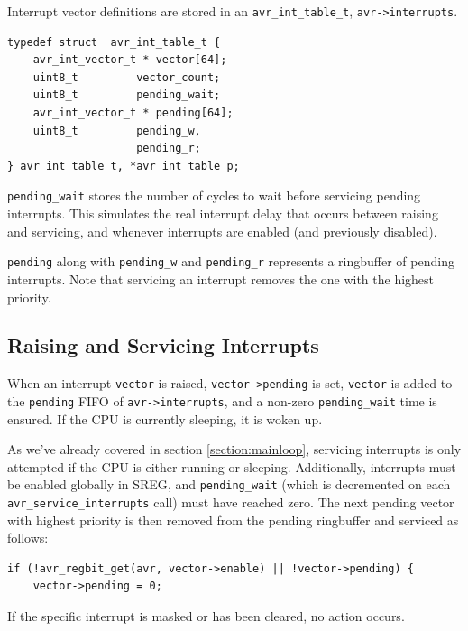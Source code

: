 Interrupt vector definitions are stored in an \lstinline|avr_int_table_t|,
\lstinline|avr->interrupts|.

\begin{lstlisting}
typedef struct  avr_int_table_t {
    avr_int_vector_t * vector[64];
    uint8_t         vector_count;
    uint8_t         pending_wait;
    avr_int_vector_t * pending[64];
    uint8_t         pending_w,
                    pending_r;
} avr_int_table_t, *avr_int_table_p;
\end{lstlisting}

\lstinline|pending_wait| stores the number of cycles to wait before servicing
pending interrupts. This simulates the real interrupt delay that occurs between
raising and servicing, and whenever interrupts are enabled
(and previously disabled).

\lstinline|pending| along with \lstinline|pending_w| and \lstinline|pending_r|
represents a ringbuffer of pending interrupts. Note that servicing an
interrupt removes the one with the highest priority.


\subsection{Raising and Servicing Interrupts}

When an interrupt \lstinline|vector| is raised, \lstinline|vector->pending| is
set, \lstinline|vector| is added to the \lstinline|pending| \ac{FIFO} of
\lstinline|avr->interrupts|, and a non-zero \lstinline|pending_wait| time is
ensured. If the \ac{CPU} is currently sleeping, it is woken up.

As we've already covered in section \ref{section:mainloop}, servicing interrupts is
only attempted if the \ac{CPU} is either running or sleeping. Additionally,
interrupts must be enabled globally in \ac{SREG}, and \lstinline|pending_wait|
(which is decremented on each \lstinline|avr_service_interrupts| call) must have
reached zero. The next pending vector with highest priority is then removed from
the pending ringbuffer and serviced as follows:

\begin{lstlisting}
if (!avr_regbit_get(avr, vector->enable) || !vector->pending) {
    vector->pending = 0;
\end{lstlisting}

If the specific interrupt is masked or has been cleared, no action occurs.

